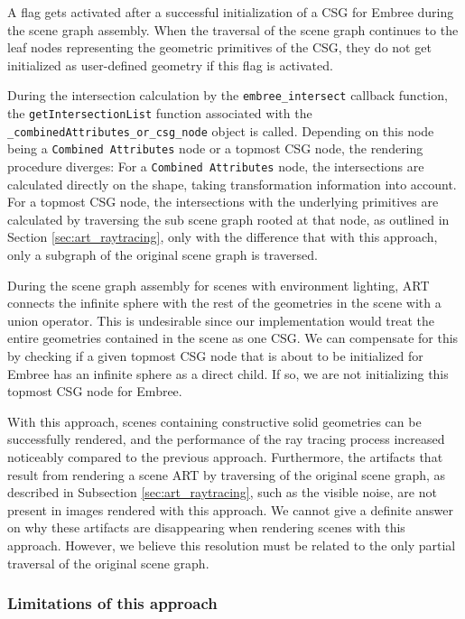 A flag gets activated after a successful initialization of a CSG for Embree during the scene graph assembly. When the traversal of the scene graph continues to the leaf nodes representing the geometric primitives of the CSG, they do not get initialized as user-defined geometry if this flag is activated.

During the intersection calculation by the \texttt{embree\_intersect} callback function, the \texttt{getIntersectionList} function associated with the \texttt{\_combinedAttributes\_or\_csg\_node} object is called. Depending on this node being a \texttt{Combined Attributes} node or a topmost CSG node, the rendering procedure diverges: For a \texttt{Combined Attributes} node, the intersections are calculated directly on the shape, taking transformation information into account. For a topmost CSG node, the intersections with the underlying primitives are calculated by traversing the sub scene graph rooted at that node, as outlined in Section \ref{sec:art_raytracing}, only with the difference that with this approach, only a subgraph of the original scene graph is traversed.

During the scene graph assembly for scenes with environment lighting, ART connects the infinite sphere with the rest of the geometries in the scene with a union operator. This is undesirable since our implementation would treat the entire geometries contained in the scene as one CSG. We can compensate for this by checking if a given topmost CSG node that is about to be initialized for Embree has an infinite sphere as a direct child. If so, we are not initializing this topmost CSG node for Embree.

With this approach, scenes containing constructive solid geometries can be successfully rendered, and the performance of the ray tracing process increased noticeably compared to the previous approach. Furthermore, the artifacts that result from rendering a scene ART by traversing of the original scene graph, as described in Subsection \ref{sec:art_raytracing}, such as the visible noise, are not present in images rendered with this approach. We cannot give a definite answer on why these artifacts are disappearing when rendering scenes with this approach. However, we believe this resolution must be related to the only partial traversal of the original scene graph.

\subsubsection{Limitations of this approach}


